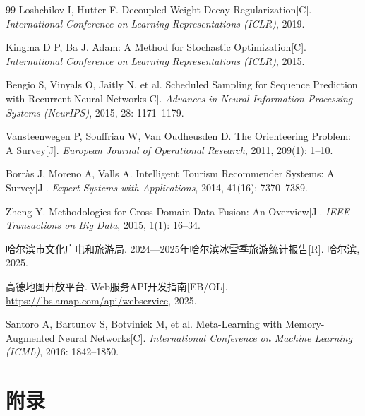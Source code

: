 \documentclass[12pt,a4paper]{ctexart}
\begin{document}
\begin{thebibliography}{99}
 Loshchilov I, Hutter F. Decoupled Weight Decay Regularization[C]. \textit{International Conference on Learning Representations (ICLR)}, 2019.

 Kingma D P, Ba J. Adam: A Method for Stochastic Optimization[C]. \textit{International Conference on Learning Representations (ICLR)}, 2015.

 Bengio S, Vinyals O, Jaitly N, et al. Scheduled Sampling for Sequence Prediction with Recurrent Neural Networks[C]. \textit{Advances in Neural Information Processing Systems (NeurIPS)}, 2015, 28: 1171--1179.

 Vansteenwegen P, Souffriau W, Van Oudheusden D. The Orienteering Problem: A Survey[J]. \textit{European Journal of Operational Research}, 2011, 209(1): 1--10.

 Borr\`{a}s J, Moreno A, Valls A. Intelligent Tourism Recommender Systems: A Survey[J]. \textit{Expert Systems with Applications}, 2014, 41(16): 7370--7389.

 Zheng Y. Methodologies for Cross-Domain Data Fusion: An Overview[J]. \textit{IEEE Transactions on Big Data}, 2015, 1(1): 16--34.

 哈尔滨市文化广电和旅游局. 2024—2025年哈尔滨冰雪季旅游统计报告[R]. 哈尔滨, 2025.

 高德地图开放平台. Web服务API开发指南[EB/OL]. \url{https://lbs.amap.com/api/webservice}, 2025.

 Santoro A, Bartunov S, Botvinick M, et al. Meta-Learning with Memory-Augmented Neural Networks[C]. \textit{International Conference on Machine Learning (ICML)}, 2016: 1842--1850.

\end{thebibliography}

\newpage

\section*{\centering\heiti\fontsize{14pt}{24pt}\selectfont 附录}
\end{document}
